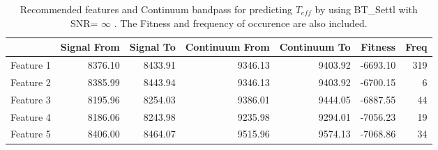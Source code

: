 {{{{\begin{table}
\begin{center}
\begin{tabular}{rrrrrrr}
  \hline
 & Signal From & Signal To & Continuum From & Continuum To & Fitness & Freq \\ 
  \hline
 Feature 1 & 8376.10 & 8433.91 & 9346.13 & 9403.92 & -6693.10 & 319 \\ 
  Feature 2 & 8385.99 & 8443.94 & 9346.13 & 9403.92 & -6700.15 &   6 \\ 
  Feature 3 & 8195.96 & 8254.03 & 9386.01 & 9444.05 & -6887.55 &  44 \\ 
  Feature 4 & 8186.06 & 8243.98 & 9235.98 & 9294.01 & -7056.23 &  19 \\ 
  Feature 5 & 8406.00 & 8464.07 & 9515.96 & 9574.13 & -7068.86 &  34 \\ 
   \hline
\end{tabular}
\caption {Recommended features and Continuum bandpass for predicting $ T_{eff} $ 
      by using BT\_Settl with SNR= $ {\infty} $ . 
      The Fitness and frequency of occurence are also included.} \label{tab:tab_NC_T} 
\end{center}
\end{table}

}}}}
